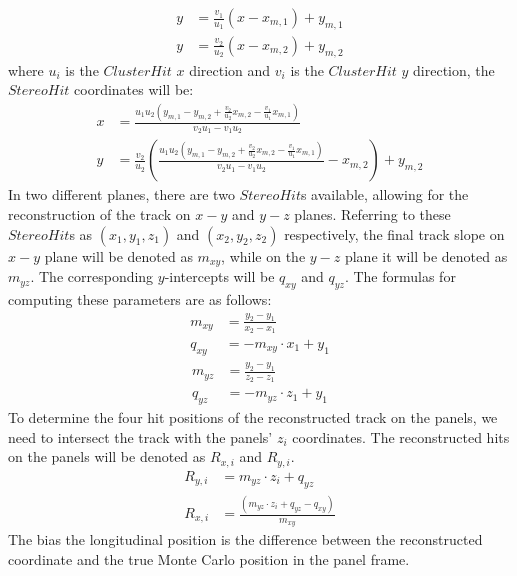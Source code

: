 {\begin{equation}
    \begin{aligned}
        y&=\frac{v_1}{u_1}(x-x_{m,1})+y_{m,1} \\
        y&=\frac{v_2}{u_2}(x-x_{m,2})+y_{m,2} 
    \end{aligned}
    \end{equation}
where $u_i$ is the $ClusterHit$ $x$ direction and $v_i$ is the $ClusterHit$ $y$ direction, the $StereoHit$ coordinates will be:
\begin{equation}\label{x}
    \begin{aligned}
x&=\frac{u_1 u_2(y_{m,1}-y_{m,2}+\frac{v_2}{u_2}x_{m,2}-\frac{v_1}{u_1}x_{m,1})}{v_2 u_1 - v_1 u_2}\\
y&=\frac{v_2}{u_2}\left(\frac{u_1 u_2(y_{m,1}-y_{m,2}+\frac{v_2}{u_2}x_{m,2}-\frac{v_1}{u_1}x_{m,1})}{v_2 u_1 - v_1 u_2}-x_{m,2}\right)+y_{m,2}
\end{aligned}
\end{equation}
In two different planes, there are two $StereoHit$s available, allowing for the reconstruction of the track on $x-y$ and $y-z$ planes. 
Referring to these $StereoHit$s as $(x_1,y_1,z_1)$ and $(x_2,y_2,z_2)$ respectively, the final track slope on $x-y$ plane will be 
denoted as $m_{xy}$, while on the $y-z$ plane it will be denoted as $m_{yz}$. The corresponding $y$-intercepts will be $q_{xy}$ and $q_{yz}$.
The formulas for computing these parameters are as follows:
\begin{equation}
    \begin{aligned}
m_{xy}&=\frac{y_2-y_1}{x_2-x_1}\\
q_{xy}&=-m_{xy} \cdot x_1+y_1
\end{aligned}
\end{equation}
\begin{equation}
    \begin{aligned}
m_{yz}&=\frac{y_2-y_1}{z_2-z_1}\\
q_{yz}&=-m_{yz} \cdot z_1+y_1
\end{aligned}
\end{equation}
To determine the four hit positions of the reconstructed track on the panels, we need to intersect the track with the panels' $z_i$ coordinates. 
The reconstructed hits on the panels will be denoted as $R_{x,i}$ and $R_{y,i}$.
\begin{equation}
    \begin{aligned}
 R_{y,i}&=m_{yz}\cdot z_i+q_{yz}\\
 R_{x,i}&=\frac{(m_{yz}\cdot z_i+q_{yz}-q_{xy})}{m_{xy}}
\end{aligned}
\end{equation}
The bias  the longitudinal position is the difference between the reconstructed coordinate and the true Monte Carlo position in the panel frame.

}
